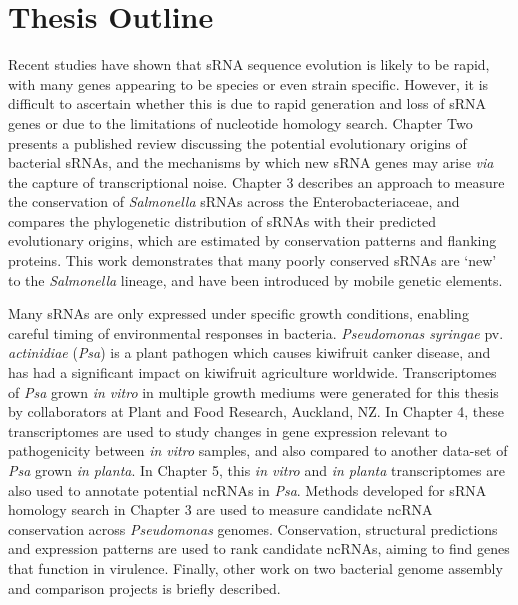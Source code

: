 \section{Thesis Outline}

Recent studies have shown that sRNA sequence evolution is likely to be rapid, with many genes appearing to be species or even strain specific. However, it is difficult to ascertain whether this is due to rapid generation and loss of sRNA genes or due to the limitations of nucleotide homology search. Chapter Two presents a published review discussing the potential evolutionary origins of bacterial sRNAs, and the mechanisms by which new sRNA genes may arise \textit{via} the capture of transcriptional noise. Chapter 3 describes an approach to measure the conservation of \textit{Salmonella} sRNAs across the Enterobacteriaceae, and compares the phylogenetic distribution of sRNAs with their predicted evolutionary origins, which are estimated by conservation patterns and flanking proteins. This work demonstrates that many poorly conserved sRNAs are ‘new’ to the \textit{Salmonella} lineage, and have been introduced by mobile genetic elements. \par

Many sRNAs are only expressed under specific growth conditions, enabling careful timing of environmental responses in bacteria. \textit{Pseudomonas syringae} pv. \textit{actinidiae} (\textit{Psa}) is a plant pathogen which causes kiwifruit canker disease, and has had a significant impact on kiwifruit agriculture worldwide. Transcriptomes of \textit{Psa} grown \textit{in vitro} in multiple growth mediums were generated for this thesis by collaborators at Plant and Food Research, Auckland, NZ. In Chapter 4, these transcriptomes are used to study changes in gene expression relevant to pathogenicity between \textit{in vitro} samples, and also compared to another data-set of \textit{Psa} grown \textit{in planta}. In Chapter 5, this \textit{in vitro} and \textit{in planta} transcriptomes are also used to annotate potential ncRNAs in \textit{Psa}. Methods developed for sRNA homology search in Chapter 3 are used to measure candidate ncRNA conservation across \textit{Pseudomonas} genomes. Conservation, structural predictions and expression patterns are used to rank candidate ncRNAs, aiming to find genes that function in virulence. Finally, other work on two bacterial genome assembly and comparison projects is briefly described. 




